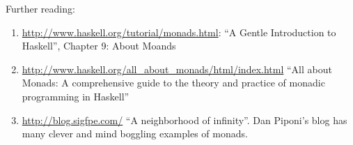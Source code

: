 \documentclass[a4paper,10pt]{article}
\begin{document}
%
Further reading:
%
\begin{enumerate}
\item  \url{http://www.haskell.org/tutorial/monads.html}:
  ``A Gentle Introduction to Haskell'', Chapter 9: About Moands
\item \url{http://www.haskell.org/all_about_monads/html/index.html}
   ``All about Monads: 
   A comprehensive guide to the theory and practice of monadic programming in Haskell''
\item \url{http://blog.sigfpe.com/}
   ``A neighborhood of infinity''.
   Dan Piponi's blog has many clever and mind boggling examples of monads.
\end{enumerate}
\end{document}
